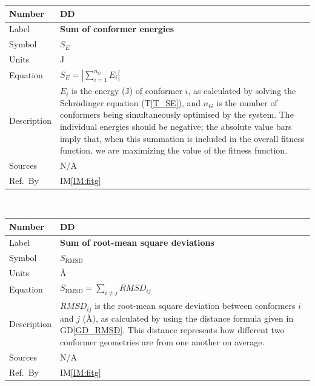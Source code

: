 \documentclass[12pt]{article}
\newcommand{\colAwidth}{0.13\textwidth}
\newcommand{\colBwidth}{0.82\textwidth}
\newcounter{defnum} %
\newcommand{\dref}[1]{GD\ref{#1}}
\newcounter{datadefnum} %
\newcommand{\iref}[1]{IM\ref{#1}}
\begin{document}
\noindent
\begin{minipage}{\textwidth}
	\renewcommand*{\arraystretch}{1.5}
	\begin{tabular}{| p{\colAwidth} | p{\colBwidth}|}
		\hline
		\rowcolor[gray]{0.9}
		Number & DD{datadefnum}\thedatadefnum \label{Sum_E}\\
		\hline
		Label & \bf Sum of conformer energies\\
		\hline
		Symbol & $S_E$\\
		\hline
		Units & \si{\joule}\\
		\hline
		Equation & $S_E = \left|\sum\limits_{i=1}^{n_G}E_i\right|$ \\
		\hline
		Description & 
		$E_i$ is the energy (\si{\joule}) of conformer $i$, as calculated by 
		solving the Schr\"{o}dinger equation (T\ref{T_SE}), and $n_G$ is the 
		number of conformers being simultaneously optimised by the system. The 
		individual energies should be negative; the absolute value bars imply 
		that, when this summation is included in the overall fitness function, 
		we are maximizing the value of the fitness 
		function.
		\\
		\hline
		Sources& N/A \\
		\hline
		Ref.\ By & \iref{IM:fitg}\\
		\hline
	\end{tabular}
\end{minipage}\\

\noindent
\begin{minipage}{\textwidth}
	\renewcommand*{\arraystretch}{1.5}
	\begin{tabular}{| p{\colAwidth} | p{\colBwidth}|}
		\hline
		\rowcolor[gray]{0.9}
		Number & DD{datadefnum}\thedatadefnum \label{Sum_RMSD}\\
		\hline
		Label & \bf Sum of root-mean square deviations \\
		\hline
		Symbol & $S_\text{RMSD}$\\
		\hline
		Units & \si{\angstrom}\\
		\hline
		Equation & $S_\text{RMSD} = \sum\limits_{i\neq j}RMSD_{ij}$ \\
		\hline
		Description & 
		$RMSD_{ij}$ is the root-mean square deviation between conformers $i$ 
		and $j$ (\si{\angstrom}), as calculated by using the distance formula 
		given in \dref{GD_RMSD}. This 
		distance represents how different two conformer geometries are from one 
		another on average.
		\\
		\hline
		Sources& N/A \\
		\hline
		Ref.\ By & \iref{IM:fitg}\\
		\hline
	\end{tabular}
\end{minipage}\\
\end{document}
